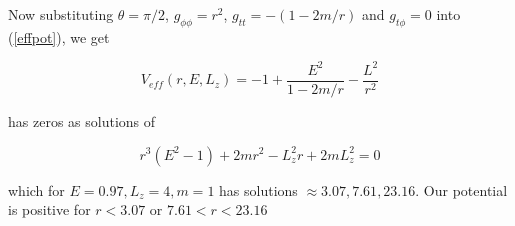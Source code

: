 \documentclass[10pt,a4paper]{report}
\begin{document}
Now substituting $\theta=\pi/2$, $g_{\phi\phi} = r^2$, $g_{tt}=-(1-2m/r)$ and $g_{t\phi} = 0$ into (\ref{effpot}), we get 

\begin{equation*}
V_{eff}(r, E, L_z) = -1 + \frac{E^2}{1-2m/r} - \frac{L^2}{r^2}
\end{equation*}

has zeros as solutions of 

\begin{equation*}
r^3(E^2-1) + 2mr^2 -L_z^2r+2mL_z^2=0
\end{equation*}

which for $E=0.97, L_z=4, m=1$ has solutions $\approx 3.07, 7.61, 23.16$. Our potential is positive for $r<3.07$ or $7.61 < r < 23.16$  
\end{document}
